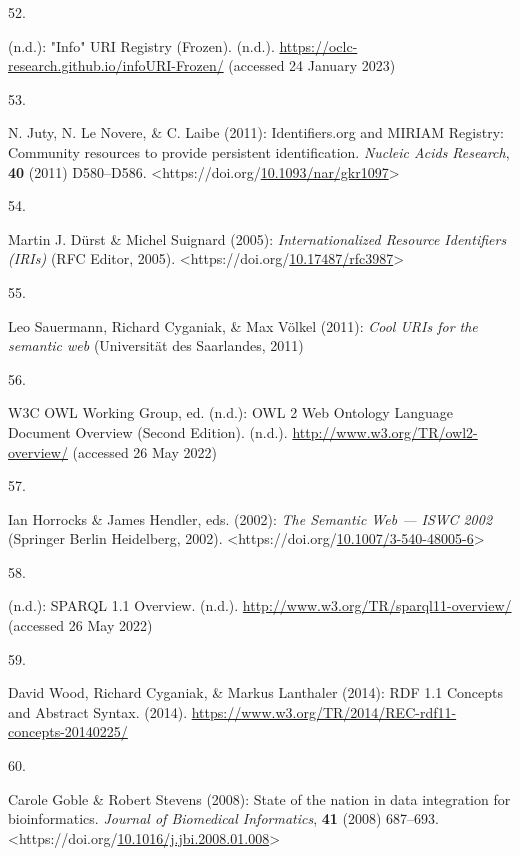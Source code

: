 \begin{thebibliography}{9}
\hypertarget{ref-InfoURIRegistry}{}
52.

(n.d.): "Info" {URI Registry} ({Frozen}). (n.d.).
\url{https://oclc-research.github.io/infoURI-Frozen/} (accessed 24
January 2023)

\hypertarget{ref-jutyIdentifiersOrgMIRIAM2011}{}
53.

N. Juty, N. Le Novere, \& C. Laibe (2011): Identifiers.org and {MIRIAM
Registry}: Community resources to provide persistent identification.
\emph{Nucleic Acids Research}, \textbf{40} (2011) D580--D586.
\textless https://doi.org/\href{https://doi.org/10.1093/nar/gkr1097}{10.1093/nar/gkr1097}\textgreater{}

\hypertarget{ref-rfc3987}{}
54.

Martin J. Dürst \& Michel Suignard (2005): \emph{Internationalized
{Resource Identifiers} ({IRIs})} ({RFC Editor}, 2005).
\textless https://doi.org/\href{https://doi.org/10.17487/rfc3987}{10.17487/rfc3987}\textgreater{}

\hypertarget{ref-sauermannCoolURIsSemantic2011}{}
55.

Leo Sauermann, Richard Cyganiak, \& Max Völkel (2011): \emph{Cool {URIs}
for the semantic web} ({Universität des Saarlandes}, 2011)

\hypertarget{ref-w3-owl2-overview}{}
56.

W3C OWL Working Group, ed. (n.d.): {OWL} 2 {Web Ontology Language
Document Overview} ({Second Edition}). (n.d.).
\url{http://www.w3.org/TR/owl2-overview/} (accessed 26 May 2022)

\hypertarget{ref-horrocksSemanticWebISWC2002}{}
57.

Ian Horrocks \& James Hendler, eds. (2002): \emph{The {Semantic Web} ---
{ISWC} 2002} ({Springer Berlin Heidelberg}, 2002).
\textless https://doi.org/\href{https://doi.org/10.1007/3-540-48005-6}{10.1007/3-540-48005-6}\textgreater{}

\hypertarget{ref-w3-sparql11-overview}{}
58.

(n.d.): {SPARQL} 1.1 {Overview}. (n.d.).
\url{http://www.w3.org/TR/sparql11-overview/} (accessed 26 May 2022)

\hypertarget{ref-w3-rdf11-concepts}{}
59.

David Wood, Richard Cyganiak, \& Markus Lanthaler (2014): {RDF 1.1
Concepts and Abstract Syntax}. (2014).
\url{https://www.w3.org/TR/2014/REC-rdf11-concepts-20140225/}

\hypertarget{ref-gobleStateNationData2008c}{}
60.

Carole Goble \& Robert Stevens (2008): State of the nation in data
integration for bioinformatics. \emph{Journal of Biomedical
Informatics}, \textbf{41} (2008) 687--693.
\textless https://doi.org/\href{https://doi.org/10.1016/j.jbi.2008.01.008}{10.1016/j.jbi.2008.01.008}\textgreater{}


\end{thebibliography}
